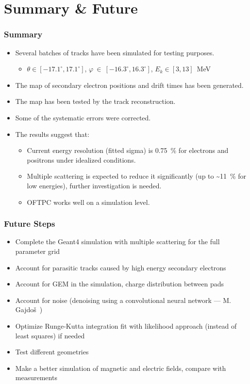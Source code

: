 \documentclass{beamer}
\renewcommand{\textapprox}{{\textasciitilde}}
\begin{document}
	\section{Summary \& Future}	
	\begin{frame}
		\frametitle{Summary}
		\begin{itemize}
			\item Several batches of tracks have been simulated for testing purposes.
			\begin{itemize}
				\item $\theta\in[-17.1^\circ,17.1^\circ]$, $\varphi~\in~[-16.3^\circ,16.3^\circ]$, $ E_k \in [3,13] $~MeV
			\end{itemize}
			\item The map of secondary electron positions and drift times has been generated.
			\item The map has been tested by the track reconstruction.
			\item Some of the systematic errors were corrected.
			\item The results suggest that:
			\begin{itemize}
				\item Current energy resolution (fitted sigma) is 0.75~\% for electrons and positrons under idealized conditions.
				\item Multiple scattering is expected to reduce it significantly (up to \textapprox 11~\% for low energies), further investigation is needed.
				\item OFTPC works well on a simulation level.
			\end{itemize}
		\end{itemize}
	\end{frame}
	\begin{frame}
		\frametitle{Future Steps}
		\begin{itemize}
			\item Complete the Geant4 simulation with multiple scattering for the full parameter grid
			\item Account for parasitic tracks caused by high energy secondary electrons
			\item Account for GEM in the simulation, charge distribution between pads
			\item Account for noise (denoising using a convolutional neural network --- M. Gajdoš~\cite{Gajdoš_2025})
			\item Optimize Runge-Kutta integration fit with likelihood approach (instead of least squares) if needed
			\item Test different geometries
			\item Make a better simulation of magnetic and electric fields, compare with measurements
		\end{itemize}
	\end{frame}
	
\end{document}
